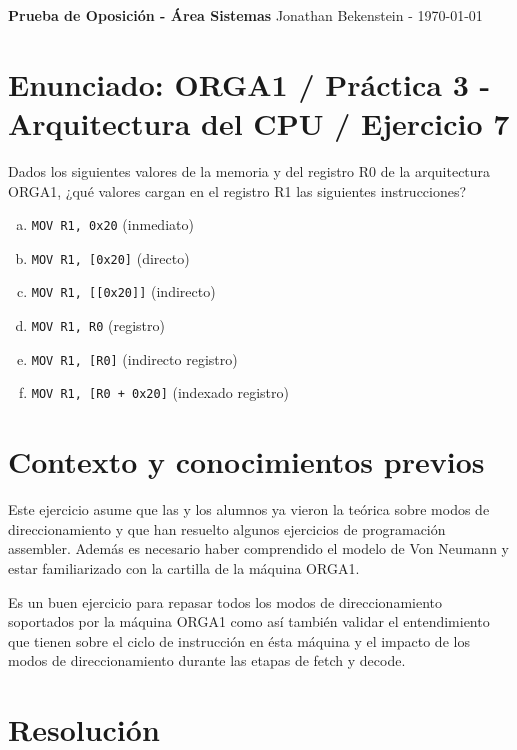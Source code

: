 

\setupsizes{9pt}



\textbf{Prueba de Oposición - Área Sistemas}
\hfill
Jonathan Bekenstein - \today

\section*{Enunciado: \normalsize{ORGA1 / Práctica 3 - Arquitectura del CPU / Ejercicio 7}}

Dados los siguientes valores de la memoria y del registro R0 de la arquitectura ORGA1, ¿qué valores cargan en el registro R1 las siguientes instrucciones?

\begin{multicols}{2}
    \begin{enumerate}[a)]
        \item \lstinline{MOV R1, 0x20} (inmediato)
        \item \lstinline{MOV R1, [0x20]} (directo)
        \item \lstinline{MOV R1, [[0x20]]} (indirecto)
        \item \lstinline{MOV R1, R0} (registro)
        \item \lstinline{MOV R1, [R0]} (indirecto registro)
        \item \lstinline{MOV R1, [R0 + 0x20]} (indexado registro)
    \end{enumerate}
    \columnbreak
    
\end{multicols}

\section*{Contexto y conocimientos previos}

Este ejercicio asume que las y los alumnos ya vieron la teórica sobre modos de direccionamiento y que han resuelto algunos ejercicios de programación assembler. Además es necesario haber comprendido el modelo de Von Neumann y estar familiarizado con la cartilla de la máquina ORGA1.

Es un buen ejercicio para repasar todos los modos de direccionamiento soportados por la máquina ORGA1 como así también validar el entendimiento que tienen sobre el ciclo de instrucción en ésta máquina y el impacto de los modos de direccionamiento durante las etapas de fetch y decode.

\section*{Resolución}

